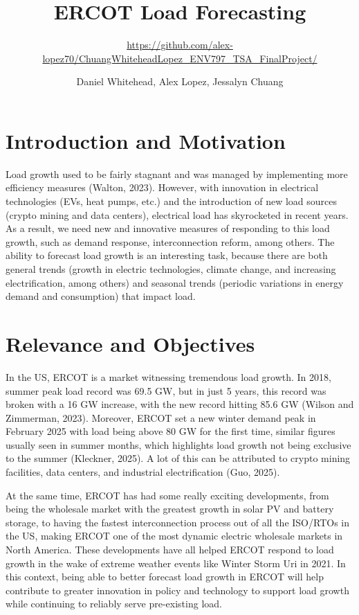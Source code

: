 \documentclass[
]{article}
\title{\textbf{ERCOT Load Forecasting}}
\subtitle{\url{https://github.com/alex-lopez70/ChuangWhiteheadLopez_ENV797_TSA_FinalProject/}}
\author{Daniel Whitehead, Alex Lopez, Jessalyn Chuang}
\date{}
\begin{document}
\maketitle

{
\setcounter{tocdepth}{3}
\tableofcontents
}
\listoffigures

\newpage

\section{Introduction and Motivation}\label{introduction-and-motivation}

Load growth used to be fairly stagnant and was managed by implementing
more efficiency measures (Walton, 2023). However, with innovation in
electrical technologies (EVs, heat pumps, etc.) and the introduction of
new load sources (crypto mining and data centers), electrical load has
skyrocketed in recent years. As a result, we need new and innovative
measures of responding to this load growth, such as demand response,
interconnection reform, among others. The ability to forecast load
growth is an interesting task, because there are both general trends
(growth in electric technologies, climate change, and increasing
electrification, among others) and seasonal trends (periodic variations
in energy demand and consumption) that impact load.

\section{Relevance and Objectives}\label{relevance-and-objectives}

In the US, ERCOT is a market witnessing tremendous load growth. In 2018,
summer peak load record was 69.5 GW, but in just 5 years, this record
was broken with a 16 GW increase, with the new record hitting 85.6 GW
(Wilson and Zimmerman, 2023). Moreover, ERCOT set a new winter demand
peak in February 2025 with load being above 80 GW for the first time,
similar figures usually seen in summer months, which highlights load
growth not being exclusive to the summer (Kleckner, 2025). A lot of this
can be attributed to crypto mining facilities, data centers, and
industrial electrification (Guo, 2025).

At the same time, ERCOT has had some really exciting developments, from
being the wholesale market with the greatest growth in solar PV and
battery storage, to having the fastest interconnection process out of
all the ISO/RTOs in the US, making ERCOT one of the most dynamic
electric wholesale markets in North America. These developments have all
helped ERCOT respond to load growth in the wake of extreme weather
events like Winter Storm Uri in 2021. In this context, being able to
better forecast load growth in ERCOT will help contribute to greater
innovation in policy and technology to support load growth while
continuing to reliably serve pre-existing load.
\end{document}
